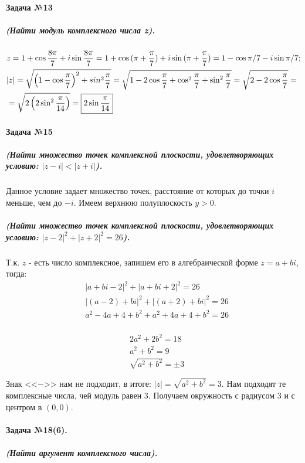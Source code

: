 \documentclass[a4paper,12pt]{report}
\begin{document}
\paragraph{Задача №13}
\subparagraph{(Найти модуль комплексного числа z).}

\begin{align*}
	&z=1+\cos{\dfrac{8\pi}{7}}+i\sin{\dfrac{8\pi}{7}}=	
	1+\cos{(\pi+\dfrac{\pi}{7})}+i\sin{(\pi+\dfrac{\pi}{7})}=	
	1-\cos\pi/7-i\sin\pi/7;\\
	&|z|=\sqrt{\left(1-\cos{\dfrac{\pi}{7}}\right)^2+sin^2{\dfrac{\pi}{7}}}=
	\sqrt{1-2\cos{\dfrac{\pi}{7}}+
	\cos^2{\dfrac{\pi}{7}}+\sin^2\dfrac{\pi}{7}}=
	\sqrt{2-2\cos{\dfrac{\pi}{7}}}=\\
	&=\sqrt{2\left(2\sin^2{\dfrac{\pi}{14}}\right)}=
	\fbox{$ 2\sin{\dfrac{\pi}{14}} $}
\end{align*}
 
\paragraph{Задача №15}
\subparagraph{(Найти множество точек комплексной плоскости, удовлетворяющих условию: $ |z-i|<|z+i| $).} 
Данное условие задает множество точек, расстояние от которых 
до точки $ i $ меньше, чем до $ -i $. Имеем верхнюю полуплоскость $ y>0 $.

\subparagraph{(Найти множество точек комплексной плоскости, удовлетворяющих условию: $ |z-2|^2+|z+2|^2=26 $).}
Т.к. $ z $ - есть число комплексное, запишем его в алгебраической форме
$ z=a+bi $, тогда:
\begin{align*}
	&|a+bi-2|^2+|a+bi+2|^2=26\\
	&|(a-2)+bi|^2+|(a+2)+bi|^2=26\\	
	&a^2-4a+4+b^2+a^2+4a+4+b^2=26\\
\end{align*}

\begin{align*}
	&2a^2+2b^2=18\\
	&a^2+b^2=9\\
	&\sqrt{a^2+b^2}=\pm 3
\end{align*}

Знак <<$ - $>> нам не подходит, в итоге: $ |z|=\sqrt{a^2+b^2}=3 $.
Нам подходят те комплексные числа, чей модуль равен 3.
Получаем окружность с радиусом 3 и с центром в $ (0, 0) $.

\paragraph{Задача №18(6).}
\subparagraph{(Найти аргумент комплексного числа).}
\end{document}
